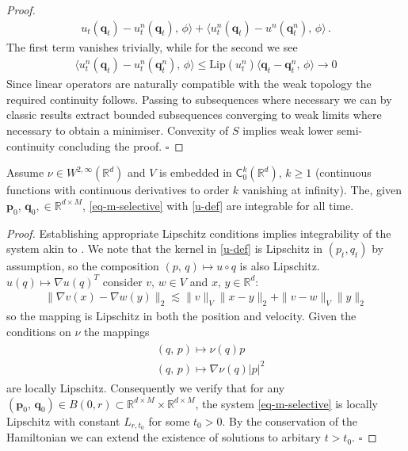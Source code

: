 \documentclass[runningheads]{llncs}
\newcommand{\norm}[2]{\| #1 \|_{ #2 }}
\newcommand{\vnorm}[1]{\norm{ #1 }{V}}
\newcommand{\ltwonorm}[1]{\norm{ #1 }{2}}
\newcommand{\Rd}{\mathbb{R}^{d}}
\newcommand{\RdM}{\mathbb{R}^{d\times M}}
\begin{document}
\begin{proof}
\begin{align*}
u_t(\mathbf q_t)- u_t^n(\mathbf q_t),\,\phi\rangle + \langle u_t^n(\mathbf
q_t)-u^n(\mathbf q_t^n),\,\phi\rangle\,.
\end{align*}
The first term vanishes trivially, while for the second we see
\begin{align*}
\langle u_t^n(\mathbf q_t)-u_t^n(\mathbf q_t^n),\,\phi\rangle \leq \text{Lip}(u_t^n)\langle \mathbf q_t-\mathbf q_t^n,\,\phi\rangle \rightarrow 0
\end{align*}
Since linear operators are naturally compatible with the weak topology the
required continuity follows.  Passing to subsequences where necessary we can by
classic results extract bounded subsequences converging to weak limits where
necessary to obtain a minimiser. Convexity of $S$ implies weak lower
semi-continuity concluding the proof.
{\hfill $\square$}
\end{proof}
\begin{theorem}
Assume $\nu \in W^{2, \infty}(\Rd)$ and $V$ is embedded in
$\textsf{C}_0^k(\Rd)$, $k\geq 1$ (continuous functions with continuous
derivatives to order $k$ vanishing at infinity). The, given $\mathbf
p_0,\,\mathbf q_0, \in \RdM$, \eqref{eq-m-selective} with \eqref{u-def} are
integrable for all time.
\end{theorem}
\begin{proof}
Establishing appropriate Lipschitz conditions implies integrability of the
system akin to \cite[Theorem 5]{cotter2013bayesian}. We note that the kernel in
\eqref{u-def} is Lipschitz in $(p_t, q_t)$ by assumption, so the composition $(p,\,q) \mapsto
u\circ q$ is also Lipschitz. $u(q)\mapsto\nabla u(q)^T$ consider $v,\,w \in V$ and $x,\,y\in\Rd$:
\begin{align}
\ltwonorm{\nabla v(x) - \nabla w(y)} \lesssim \vnorm{v} \ltwonorm{x-y} + \vnorm{v-w}\ltwonorm{y}
\end{align}
so the mapping is Lipschitz in both the position and velocity. Given the
conditions on $\nu$ the mappings
\begin{align}
  \begin{split}
    & (q,\,p)\mapsto \nu(q)p\\
    &(q,\,p)\mapsto \nabla \nu(q)|p|^2
  \end{split}\label{nu_maps}
\end{align}
are locally Lipschitz. Consequently we verify that for any $(\mathbf
p_0,\,\mathbf q_0)\in B(0,r)\subset \RdM\times\RdM$, the system
\eqref{eq-m-selective} is locally Lipschitz with constant $L_{r,t_0}$ for some
$t_0>0$. By the conservation of the Hamiltonian we can extend the existence of
solutions to arbitary $t>t_0$.
{\hfill $\square$}
\end{proof}
\end{document}

